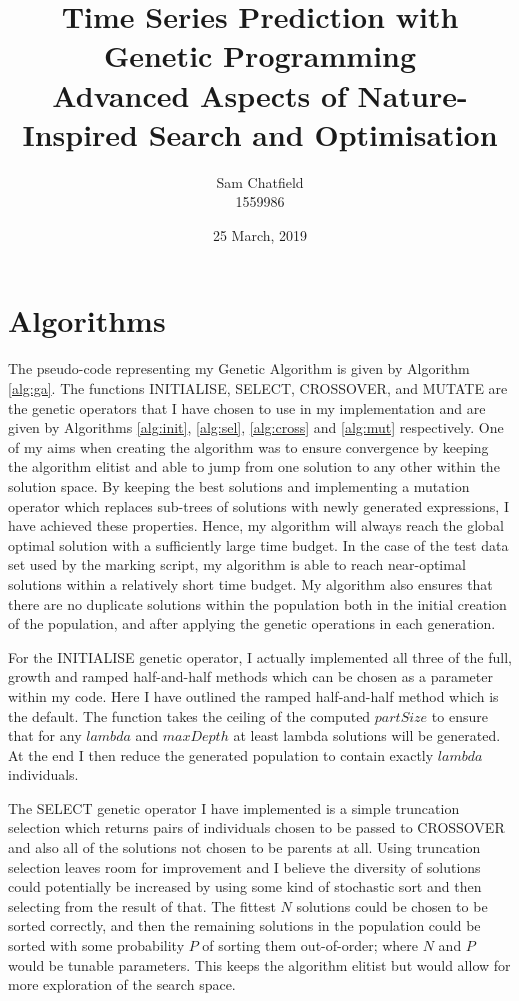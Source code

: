 \documentclass[11pt]{article}
\title{
  Time Series Prediction with Genetic Programming\\
  \large Advanced Aspects of Nature-Inspired Search and Optimisation
}
\author{
  Sam Chatfield\\
  1559986
}
\date{25 March, 2019}
\begin{document}
\maketitle

\section{Algorithms}

The pseudo-code representing my Genetic Algorithm is given by Algorithm \ref{alg:ga}.
The functions INITIALISE, SELECT, CROSSOVER, and MUTATE are the genetic operators that I have chosen to use in my implementation and are given by Algorithms \ref{alg:init}, \ref{alg:sel}, \ref{alg:cross} and \ref{alg:mut} respectively.
One of my aims when creating the algorithm was to ensure convergence by keeping the algorithm elitist and able to jump from one solution to any other within the solution space.
By keeping the best solutions and implementing a mutation operator which replaces sub-trees of solutions with newly generated expressions, I have achieved these properties.
Hence, my algorithm will always reach the global optimal solution with a sufficiently large time budget.
In the case of the test data set used by the marking script, my algorithm is able to reach near-optimal solutions within a relatively short time budget.
My algorithm also ensures that there are no duplicate solutions within the population both in the initial creation of the population, and after applying the genetic operations in each generation.

For the INITIALISE genetic operator, I actually implemented all three of the full, growth and ramped half-and-half methods which can be chosen as a parameter within my code.
Here I have outlined the ramped half-and-half method which is the default.
The function takes the ceiling of the computed $partSize$ to ensure that for any $lambda$ and $maxDepth$ at least lambda solutions will be generated.
At the end I then reduce the generated population to contain exactly $lambda$ individuals.

The SELECT genetic operator I have implemented is a simple truncation selection which returns pairs of individuals chosen to be passed to CROSSOVER and also all of the solutions not chosen to be parents at all.
Using truncation selection leaves room for improvement and I believe the diversity of solutions could potentially be increased by using some kind of stochastic sort and then selecting from the result of that.
The fittest $N$ solutions could be chosen to be sorted correctly, and then the remaining solutions in the population could be sorted with some probability $P$ of sorting them out-of-order; where $N$ and $P$ would be tunable parameters.
This keeps the algorithm elitist but would allow for more exploration of the search space.
\end{document}
